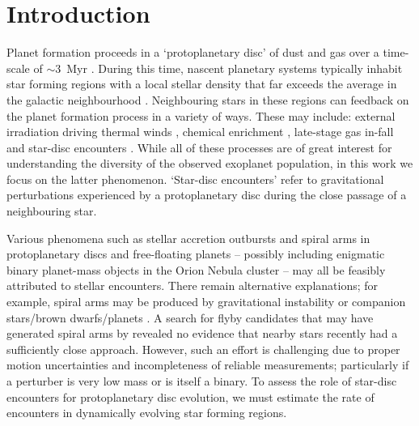 \documentclass{aa}
\begin{document}
\section{Introduction}


Planet formation proceeds in a `protoplanetary disc' of dust and gas over a time-scale of $\sim 3$~Myr \citep[e.g.][]{Haisch01}. 
During this time, nascent planetary systems typically inhabit star forming regions with a local stellar density that far exceeds the average in the galactic neighbourhood \citep[e.g.][]{Lada03}. 
Neighbouring stars in these regions can feedback on the planet formation process in a variety of ways. 
These may include: external irradiation driving thermal winds \citep[][and references therein]{WinterHaworth22}, chemical enrichment \citep{Bastian13, Lichtenberg16, Parker23_enrichment}, late-stage gas in-fall \citep{Dullemond19, Kuffmeier20, Kuffmeier21, Kuffmeier23} and star-disc encounters \citep[][]{Cuello19, Cuello20, Cuello23}.
While all of these processes are of great interest for understanding the diversity of the observed exoplanet population, in this work we focus on the latter phenomenon. 
`Star-disc encounters' refer to gravitational perturbations experienced by a protoplanetary disc during the close passage of a neighbouring star. 


Various phenomena such as stellar accretion outbursts \citep{Pfalzner08, Forgan10, Vorobyov21, Dong22} and spiral arms in protoplanetary discs \citep[e.g.][]{deRosa19} and free-floating planets \citep[e.g.][]{Vorobyov17} -- possibly including enigmatic binary planet-mass objects in the Orion Nebula cluster \citep{Pearson23, Wang23, PortegiesZwart23} -- may all be feasibly attributed to stellar encounters. There remain alternative explanations; for example, spiral arms may be produced by gravitational instability \citep[e.g.][]{Douglas13, Meru17, Baehr21} or companion stars/brown dwarfs/planets \citep[e.g.][]{Dong15, Ren20}. A search for flyby candidates that may have generated spiral arms by \citet{Shuai22} revealed no evidence that nearby stars recently had a sufficiently close approach. However, such an effort is challenging due to proper motion uncertainties and incompleteness of reliable measurements; particularly if a perturber is very low mass or is itself a binary. To assess the role of star-disc encounters for protoplanetary disc evolution, we must estimate the rate of encounters in dynamically evolving star forming regions.  
\end{document}
